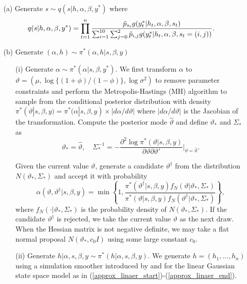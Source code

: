 \begin{itemize}
    \item[(a)] Generate $s \sim q(s|h,\alpha, \beta, y^*)$ where
    \begin{align*}
    &q(s|h,\alpha,\beta, y^*) = \prod_{t=1}^n \frac{\Tilde{p}_{s_t} g(y_t^*| h_t, \alpha,\beta, s_t)}{\sum_{i=1}^{10}\sum_{j=0}^2 \Tilde{p}_{i,j} g(y_t^*| h_t, \alpha,\beta, s_t=(i,j))}.
    \end{align*}

    \item[(b)] Generate $(\alpha,h)\sim \pi^*(\alpha,h|s,\beta,y)$
        \begin{itemize}
        \item[(i)]  Generate $\alpha \sim \pi^*(\alpha|s,\beta,y^*)$. 
        We first transform $\alpha$ to $\vartheta = (\mu, \log\{ (1+\phi)/(1-\phi) \}, \log \sigma^2)$ to remove parameter constraints and perform the Metropolis-Hastings (MH) algorithm \citep{ChibGreenberg95} to sample from the conditional posterior distribution with density $\pi^*(\vartheta|s,\beta,y) = \pi^*(\alpha|s, \beta,y) \times |d\alpha / d\vartheta|$ where $|d\alpha / d\vartheta|$ is the Jacobian of the transformation. 
        Compute the posterior mode $\hat{\vartheta}$ and define $\vartheta_*$ and $\Sigma_*$ as
        \begin{equation*}
        \vartheta_* = \hat{\vartheta}, \quad
        \Sigma_*^{-1} = -\frac{\partial^2 \log \pi^*(\vartheta|s,\beta, y)}{\partial \vartheta \partial \vartheta'} \bigg|_{\vartheta = \hat{\vartheta}}.
        \end{equation*}
    
        Given the current value $\vartheta$, generate a candidate $\vartheta^\dag$ from the distribution $N(\vartheta_*, \Sigma_*)$ and accept it with probability
        \begin{equation*}
        \alpha(\vartheta, \vartheta^\dag|s,\beta, y) = \min \left\{1, \frac{\pi^*(\vartheta^\dag|s, \beta, y) f_N(\vartheta|\vartheta_*, \Sigma_*)}{\pi^*(\vartheta|s, \beta,y) f_N(\vartheta^\dag|\vartheta_*, \Sigma_*)} \right\},
        \end{equation*}
        where $f_N(\cdot|\vartheta_*, \Sigma_*)$ is the probability density of $N(\vartheta_*, \Sigma_*)$. 
        If the candidate $\vartheta^\dag$ is rejected, we take the current value $\vartheta$ as the next draw. When the Hessian matrix is not negative definite, we may take a flat normal proposal $N(\vartheta_*, c_0 I)$ using some large constant $c_0$. 
        \item[(ii)] Generate $h|\alpha, s, \beta, y \sim \pi^*(h|\alpha, s, \beta, y)$. We generate $h = (h_1, ..., h_n)$ using a simulation smoother introduced by \cite{DeShephard(95)} and \cite{DurbinKoopman(02)} for the linear Gaussian state space model as in (\ref{approx_linaer_start})-(\ref{approx_linaer_end}).
     
    \end{itemize}
\end{itemize}
\bigskip


